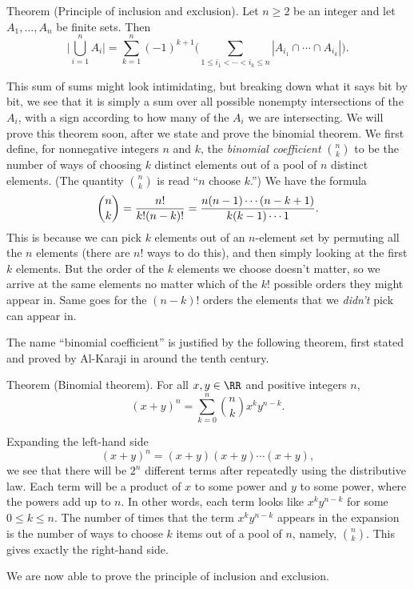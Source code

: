 \edef\thminclusionexclusion{\the\thmcount}
\parenproclaim Theorem {\advthm} (Principle of inclusion and exclusion). Let $n\ge 2$
be an integer and let $A_1,\ldots, A_n$ be finite sets. Then
$$\biggl| \bigcup_{i=1}^n A_i\biggr|
=\sum_{k=1}^n (-1)^{k+1}\biggl(\sum_{1\le i_1<\cdots<i_k\le n}|A_{i_1}\cap\cdots\cap A_{i_k}|\biggr).$$

This sum of sums might look intimidating, but breaking down what it says bit by bit,
we see that it is simply a sum over all possible nonempty intersections of the $A_i$, with a sign
according to how many of the $A_i$ we are intersecting. We will prove this theorem soon,
after we state and prove the binomial theorem. We first define, for nonnegative integers
$n$ and $k$, the {\it binomial coefficient} ${n\choose k}$ to be the number of ways of choosing
$k$ distinct elements out of a pool of $n$ distinct elements. (The quantity ${n\choose k}$
is read ``$n$ choose $k$.'') We have the formula
$${n\choose k} = {n!\over k!(n-k)!} = {n(n-1)\cdots (n-k+1)\over k(k-1)\cdots 1}.$$
This is because we can pick $k$ elements out of an $n$-element set by permuting all the $n$ elements
(there are $n!$ ways to do this), and then simply looking at the first $k$ elements. But the order
of the $k$ elements we choose doesn't matter, so we arrive at the same elements no matter which
of the $k!$ possible orders they might appear in. Same goes for the $(n-k)!$ orders the elements
that we {\it didn't} pick can appear in.

The name ``binomial coefficient'' is justified by the following theorem, first stated and
proved by Al-Karaji in around the tenth century.

\parenproclaim Theorem {\advthm} (Binomial theorem). For all $x,y\in \RR$ and positive integers $n$,
$$(x+y)^n = \sum_{k=0}^n {n\choose k} x^k y^{n-k}.$$

\proof Expanding the left-hand side
$$(x+y)^n = (x+y)(x+y)\cdots (x+y),$$
we see that there will be $2^n$ different terms after repeatedly using the distributive law.
Each term will be a product of $x$ to some power and $y$ to some power, where the powers add up to $n$.
In other words, each term looks like $x^ky^{n-k}$ for some $0\le k\le n$. The number of times
that the term $x^k y^{n-k}$ appears in the expansion
is the number of ways to choose $k$ items out of a pool of $n$, namely,
${n\choose k}$. This gives exactly the right-hand side.\slug

We are now able to prove the principle of inclusion and exclusion.


